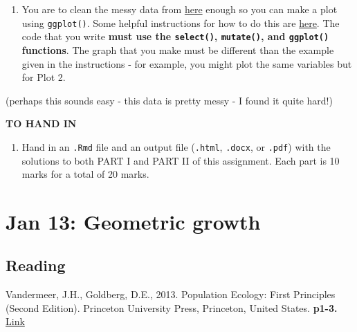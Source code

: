\documentclass[
]{book}
\providecommand{\tightlist}{%
  \setlength{\itemsep}{0pt}\setlength{\parskip}{0pt}}
\begin{document}
\begin{enumerate}
\def\labelenumi{\arabic{enumi}.}
\tightlist
\item
  You are to clean the messy data from \href{https://datacarpentry.org/semester-biology/exercises/Tidy-data-improving-messy-data-SQL/}{here} enough so you can make a plot using \texttt{ggplot()}. Some helpful instructions for how to do this are \protect\hyperlink{partII}{here}. The code that you write \textbf{must use the \texttt{select()}, \texttt{mutate()}, and \texttt{ggplot()} functions}. The graph that you make must be different than the example given in the instructions - for example, you might plot the same variables but for Plot 2.
\end{enumerate}

(perhaps this sounds easy - this data is pretty messy - I found it quite hard!)

\textbf{TO HAND IN}

\begin{enumerate}
\def\labelenumi{\arabic{enumi}.}
\tightlist
\item
  Hand in an \texttt{.Rmd} file and an output file (\texttt{.html}, \texttt{.docx}, or \texttt{.pdf}) with the solutions to both PART I and PART II of this assignment. Each part is 10 marks for a total of 20 marks.
\end{enumerate}

\hypertarget{jan-13-geometric-growth}{%
\chapter{Jan 13: Geometric growth}\label{jan-13-geometric-growth}}

\hypertarget{reading}{%
\section{Reading}\label{reading}}

Vandermeer, J.H., Goldberg, D.E., 2013. Population Ecology: First Principles (Second Edition). Princeton University Press, Princeton, United States. \textbf{p1-3.} \href{https://ebookcentral-proquest-com.qe2a-proxy.mun.ca/lib/mun/detail.action?docID=1205619}{Link}
\end{document}
